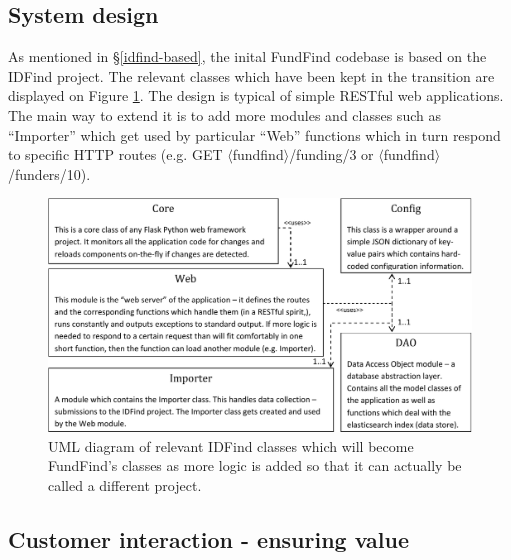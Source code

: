 \documentclass[11pt,fleqn,twoside]{article}
\begin{document}
\subsection{System design}
As mentioned in \S\ref{idfind-based}, the inital FundFind codebase is based on the IDFind project. The relevant classes which have been kept in the transition are displayed on Figure \ref{fig:idfind-uml}. The design is typical of simple RESTful web applications. The main way to extend it is to add more modules and classes such as ``Importer'' which get used by particular ``Web'' functions which in turn respond to specific HTTP routes (e.g. GET $\langle$fundfind$\rangle$/funding/3 or $\langle$fundfind$\rangle$/funders/10).

\begin{figure}[!h]
\centering
\includegraphics[width=1.00\textwidth,]{idfind-uml.pdf}
\caption{UML diagram of relevant IDFind classes which will become FundFind's classes as more logic is added so that it can actually be called a different project.}
\label{fig:idfind-uml}
\end{figure}


\subsection{Customer interaction - ensuring value}
\end{document}
